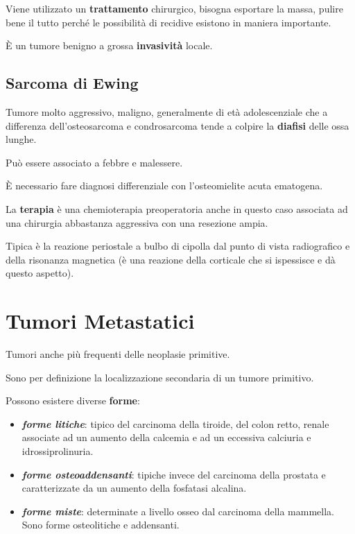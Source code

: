 Viene utilizzato un \textbf{trattamento} chirurgico, bisogna esportare la massa, pulire bene il tutto perché le possibilità di recidive esistono in maniera importante.

È un tumore benigno a grossa \textbf{invasività} locale.

\subsection{Sarcoma di Ewing}

Tumore molto aggressivo, maligno, generalmente di età adolescenziale che a differenza dell'osteosarcoma e condrosarcoma tende a colpire la \textbf{diafisi} delle ossa lunghe.

Può essere associato a febbre e malessere.

È necessario fare diagnosi differenziale con l'osteomielite acuta ematogena.

La \textbf{terapia} è una chemioterapia preoperatoria anche in questo caso associata ad una chirurgia abbastanza aggressiva con una resezione ampia.

Tipica è la reazione periostale a bulbo di cipolla dal punto di vista radiografico e della risonanza magnetica (è una reazione della corticale che si ispessisce e dà questo aspetto).

\section{Tumori Metastatici}

Tumori anche più frequenti delle neoplasie primitive.

Sono per definizione la localizzazione secondaria di un tumore primitivo.

Possono esistere diverse \textbf{forme}:

\begin{itemize}
\item
  \emph{\textbf{forme litiche}}: tipico del carcinoma della tiroide, del colon retto, renale associate ad un aumento della calcemia e ad un eccessiva calciuria e idrossiprolinuria.
\item
  \emph{\textbf{forme osteoaddensanti}}: tipiche invece del carcinoma della prostata e caratterizzate da un aumento della fosfatasi alcalina.
\item
  \emph{\textbf{forme miste}}: determinate a livello osseo dal carcinoma della mammella. Sono forme osteolitiche e addensanti.
\end{itemize}

